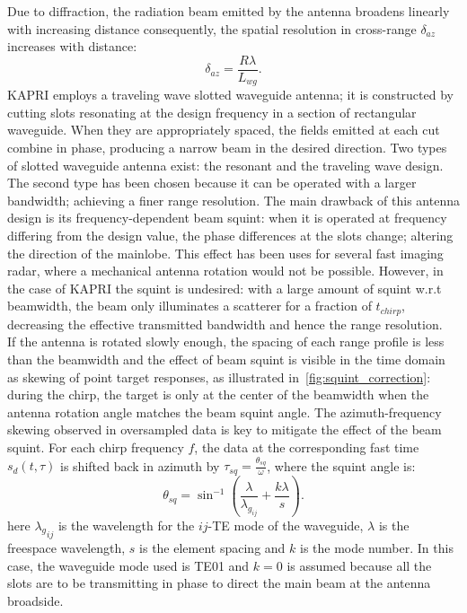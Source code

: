 Due to diffraction, the radiation beam emitted by the antenna broadens linearly with increasing distance consequently, the spatial resolution in cross-range $\delta_{az}$ increases with distance:
\begin{equation}\label{eq:azimuth_ground_resolution}
	\delta_{az} = \frac{R \lambda}{L_{wg}}.
\end{equation}
KAPRI employs a traveling wave slotted waveguide antenna\cite{Hines1953a,Granet2007}; it is constructed by cutting slots resonating at the design frequency in a section of rectangular waveguide. When they are appropriately spaced, the fields emitted at each cut combine in phase, producing a narrow beam in the desired direction. Two types of slotted waveguide antenna exist\cite{Enjiu2013}: the resonant and the traveling wave design. The second type has been chosen because it can be operated with a larger bandwidth; achieving a finer range resolution. The main drawback of this antenna design is its frequency-dependent beam squint: when it is operated at frequency differing from the design value, the phase differences at the slots change; altering the direction of the mainlobe. This effect has been uses for several fast imaging radar, where a mechanical antenna rotation would not be possible\cite{Yang2014,Yang2012,Mayer2003,Alvarez2013}. However, in the case of KAPRI the squint is undesired: with a large amount of squint w.r.t beamwidth, the beam only illuminates a scatterer for a fraction of $t_{chirp}$, decreasing the effective transmitted bandwidth and hence the range resolution. \\ 
If the antenna is rotated slowly enough,  the spacing of each range profile is less than the beamwidth and the effect of beam squint is visible in the time domain as skewing of point target responses, as illustrated in~\autoref{fig:squint_correction}: during the chirp, the target is only at the center of the beamwidth when the antenna rotation angle matches the beam squint angle. 
The azimuth-frequency skewing observed in oversampled data is key to mitigate the effect of the beam squint. For each chirp frequency $f$, the data at the corresponding fast time $s_{d}\left(t,\tau\right)$ is shifted back in azimuth by $\tau_{sq}=\frac{\theta_{sq}}{\omega}$, where the squint angle is:
\begin{equation}\label{eq:squint_exact}
	\theta_{sq} = \sin^{-1}\left(\frac{\lambda}{\lambda_{g_{ij}}} + \frac{k \lambda}{s}\right).
\end{equation}
here ${\lambda_g}_{ij}$ is the wavelength for the $ij$-TE mode of the waveguide, $\lambda$ is the freespace wavelength, $s$ is the element spacing and $k$ is the mode number. In this case, the waveguide mode used is TE01 and $k=0$ is assumed because all the slots are to be transmitting in phase\cite{kraus88} to direct the main beam at the antenna broadside.\\
